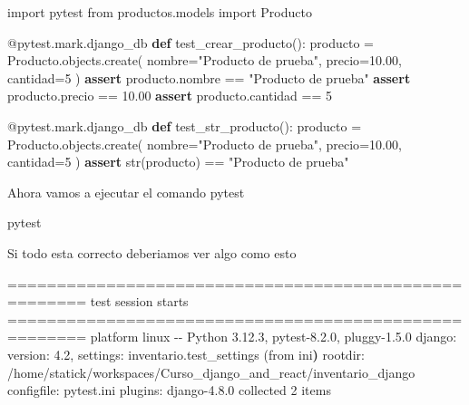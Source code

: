 \documentclass[
  a4paper,
  DIV=11,
  numbers=noendperiod,
  onepage,
  openany]{scrreprt}
\newenvironment{Shaded}{\begin{snugshade}}{\end{snugshade}}
\newcommand{\AttributeTok}[1]{\textcolor[rgb]{0.40,0.45,0.13}{#1}}
\newcommand{\BuiltInTok}[1]{\textcolor[rgb]{0.00,0.23,0.31}{#1}}
\newcommand{\ControlFlowTok}[1]{\textcolor[rgb]{0.00,0.23,0.31}{\textbf{#1}}}
\newcommand{\DecValTok}[1]{\textcolor[rgb]{0.68,0.00,0.00}{#1}}
\newcommand{\ErrorTok}[1]{\textcolor[rgb]{0.68,0.00,0.00}{#1}}
\newcommand{\ExtensionTok}[1]{\textcolor[rgb]{0.00,0.23,0.31}{#1}}
\newcommand{\FloatTok}[1]{\textcolor[rgb]{0.68,0.00,0.00}{#1}}
\newcommand{\ImportTok}[1]{\textcolor[rgb]{0.00,0.46,0.62}{#1}}
\newcommand{\KeywordTok}[1]{\textcolor[rgb]{0.00,0.23,0.31}{\textbf{#1}}}
\newcommand{\NormalTok}[1]{\textcolor[rgb]{0.00,0.23,0.31}{#1}}
\newcommand{\OperatorTok}[1]{\textcolor[rgb]{0.37,0.37,0.37}{#1}}
\newcommand{\StringTok}[1]{\textcolor[rgb]{0.13,0.47,0.30}{#1}}
\begin{document}
\begin{tcolorbox}
\begin{Shaded}
\begin{Highlighting}[]
\ImportTok{import}\NormalTok{ pytest}
\ImportTok{from}\NormalTok{ productos.models }\ImportTok{import}\NormalTok{ Producto}

\AttributeTok{@pytest.mark.django\_db}
\KeywordTok{def}\NormalTok{ test\_crear\_producto():}
\NormalTok{    producto }\OperatorTok{=}\NormalTok{ Producto.objects.create(}
\NormalTok{        nombre}\OperatorTok{=}\StringTok{"Producto de prueba"}\NormalTok{,}
\NormalTok{        precio}\OperatorTok{=}\FloatTok{10.00}\NormalTok{,}
\NormalTok{        cantidad}\OperatorTok{=}\DecValTok{5}
\NormalTok{    )}
    \ControlFlowTok{assert}\NormalTok{ producto.nombre }\OperatorTok{==} \StringTok{"Producto de prueba"}
    \ControlFlowTok{assert}\NormalTok{ producto.precio }\OperatorTok{==} \FloatTok{10.00}
    \ControlFlowTok{assert}\NormalTok{ producto.cantidad }\OperatorTok{==} \DecValTok{5}

\AttributeTok{@pytest.mark.django\_db}
\KeywordTok{def}\NormalTok{ test\_str\_producto():}
\NormalTok{    producto }\OperatorTok{=}\NormalTok{ Producto.objects.create(}
\NormalTok{        nombre}\OperatorTok{=}\StringTok{"Producto de prueba"}\NormalTok{,}
\NormalTok{        precio}\OperatorTok{=}\FloatTok{10.00}\NormalTok{,}
\NormalTok{        cantidad}\OperatorTok{=}\DecValTok{5}
\NormalTok{    )}
    \ControlFlowTok{assert} \BuiltInTok{str}\NormalTok{(producto) }\OperatorTok{==} \StringTok{"Producto de prueba"}
\end{Highlighting}
\end{Shaded}

Ahora vamos a ejecutar el comando pytest

\begin{Shaded}
\begin{Highlighting}[]
\ExtensionTok{pytest}
\end{Highlighting}
\end{Shaded}

Si todo esta correcto deberiamos ver algo como esto

\begin{Shaded}
\begin{Highlighting}[]
\ExtensionTok{======================================================}\NormalTok{ test session starts ======================================================}
\ExtensionTok{platform}\NormalTok{ linux }\AttributeTok{{-}{-}}\NormalTok{ Python 3.12.3, pytest{-}8.2.0, pluggy{-}1.5.0}
\ExtensionTok{django:}\NormalTok{ version: 4.2, settings: inventario.test\_settings }\ErrorTok{(}\ExtensionTok{from}\NormalTok{ ini}\KeywordTok{)}
\ExtensionTok{rootdir:}\NormalTok{ /home/statick/workspaces/Curso\_django\_and\_react/inventario\_django}
\ExtensionTok{configfile:}\NormalTok{ pytest.ini}
\ExtensionTok{plugins:}\NormalTok{ django{-}4.8.0}
\ExtensionTok{collected}\NormalTok{ 2 items                                                                                                               }


\end{Highlighting}
\end{Shaded}
\end{tcolorbox}
\end{document}
